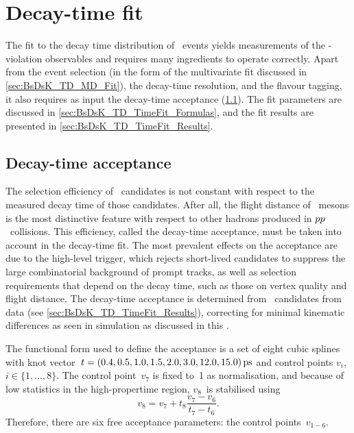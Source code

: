 \clearpage
\section{Decay-time fit} \label{sec:BsDsK_TD_TimeFit}
The fit to the decay time distribution of \BsDsK~events yields measurements of the \CP-violation observables and requires many ingredients to operate correctly.
Apart from the event selection (in the form of the multivariate fit discussed in \cref{sec:BsDsK_TD_MD_Fit}), the decay-time resolution, and the flavour tagging, it also requires as input the decay-time acceptance (\cref{sec:BsDsK_TD_Acceptance}).
The fit parameters are discussed in \cref{sec:BsDsK_TD_TimeFit_Formulas}, and the fit results are presented in \cref{sec:BsDsK_TD_TimeFit_Results}.

\subsection{Decay-time acceptance} \label{sec:BsDsK_TD_Acceptance}
The selection efficiency of \BsDsK~candidates is not constant with respect to the measured decay time of those candidates.
After all, the flight distance of \bquark~mesons is the most distinctive feature with respect to other hadrons produced in \({{p}{p}}\)~collisions.
This efficiency, called the decay-time acceptance, must be taken into account in the decay-time fit.
The most prevalent effects on the acceptance are due to the high-level trigger, which rejects short-lived candidates to suppress the large combinatorial background of prompt tracks, as well as selection requirements that depend on the decay time, such as those on vertex quality and flight distance.
The decay-time acceptance is determined from \BsDsPi~candidates from data (see \cref{sec:BsDsK_TD_TimeFit_Results}), correcting for minimal kinematic differences as seen in simulation as discussed in this .

The functional form used to define the acceptance is a set of eight cubic splines with knot vector~\({t = \SI[parse-numbers=false]{(0.4, 0.5, 1.0, 1.5, 2.0, 3.0, 12.0, 15.0)}{\ps}}\) and control points \(v_i\),~\({i \in \{1,\ldots,8\}}\).
The control point~\(v_7\) is fixed to~\num{1} as normalisation, and because of low statistics in the high-propertime region, \(v_8\)~is stabilised using
%
\begin{equation*}
    v_8 = v_7 + t_8 \dfrac{v_7 - v_6}{t_7 - t_6}.
\end{equation*}
%
Therefore, there are six free acceptance parameters: the control points~\(v_{1-6}\).

